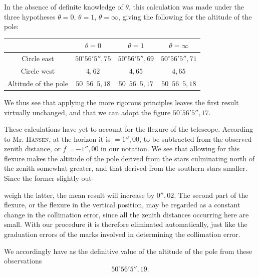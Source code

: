In the absence of definite knowledge of \(\theta\), this calculation was made
under the three hypotheses \(\theta=0\), \(\theta=1\), \(\theta=\infty\), giving
the following for the altitude of the pole:
\begin{center}
\renewcommand{\arraystretch}{1.18}%
\begin{tabular}{c|c|c|c}
&\(\theta=0\)&\(\theta=1\)&\(\theta=\infty\)\\
\hline
Circle east & \(50^\circ56'5''{,}75\) & \(50^\circ56'5''{,}69\) & \(50^\circ56'5''{,}71\)\\
Circle west & \hfill \(4{,}62\) & \hfill \(4{,}65\) & \hfill \(4{,}65\)\\
\hline
Altitude of the pole & \(50\enspace56\enspace5{,}18\) & \(50\enspace56\enspace5{,}17\) & \(50\enspace56\enspace5{,}18\)
\end{tabular}
\end{center}

We thus see that applying the more rigorous principles leaves the first result
virtually unchanged, and that we can adopt the figure \(50^\circ56'5''{,}17\).

These calculations have yet to account for the flexure of the telescope. According
to Mr. \textsc{Hansen}, at the horizon it is \(=1''{,}00\), to be subtracted from
the observed zenith distance, or \(f=-1''{,}00\) in our notation. We see that
allowing for this flexure makes the altitude of the pole derived from the stars
culminating north of the zenith somewhat greater, and that derived from the
southern stars smaller. Since the former slightly out-
\par

\par\clearpage
\noindent\makebox[12mm][l]{}\par\medskip

\noindent weigh the latter, the mean result will increase by \(0''{,}02\).
The second part of the flexure, or the flexure in the vertical position, may
be regarded as a constant change in the collimation error, since all the zenith
distances occurring here are small. With our procedure it is therefore
eliminated automatically, just like the graduation errors of the marks involved
in determining the collimation error.

We accordingly have as the definitive value of the altitude of the pole from these observations
\[
50^\circ56'5''{,}19.
\]

